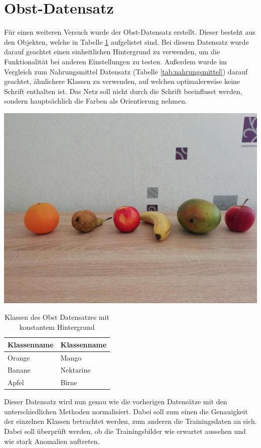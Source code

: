 \section{Obst-Datensatz}
Für einen weiteren Versuch wurde der Obst-Datensatz erstellt. Dieser besteht aus den Objekten, welche in Tabelle \ref{tab:obst} aufgelistet sind. Bei diesem Datensatz wurde darauf geachtet einen einheitlichen Hintergrund zu verwenden, um die Funktionalität bei anderen Einstellungen zu testen. Außerdem wurde im Vergleich zum Nahrungsmittel Datensatz (Tabelle \ref{tab:nahrungsmittel}) darauf geachtet, ähnlichere Klassen zu verwenden, auf welchen optimalerweise keine Schrift enthalten ist. Das Netz soll nicht durch die Schrift beeinflusst werden, sondern hauptsächlich die Farben als Orientierung nehmen.
\begin{table}[htb]
\caption{Klassen des Obst Datensatzes mit konstantem Hintergrund}
\center
\begin{minipage}[c]{.4\textwidth} 
\includegraphics[width=.8\textwidth]{Sources/Obst_mit_hintergrund}  
\end{minipage} 
\begin{minipage}[c]{.4\textwidth}\label{tab:obst}   
\begin{tabular}{|l|l|}
\hline
Klassenname & Klassenname\\
\hline
Orange & Mango\\
Banane & Nektarine\\
Apfel & Birne\\
\hline
\end{tabular} 
\end{minipage}
\end{table}  
Dieser Datensatz wird nun genau wie die vorherigen Datensätze mit den unterschiedlichen Methoden normalisiert. Dabei soll zum einen die Genauigkeit der einzelnen Klassen betrachtet werden, zum anderen die Trainingsdaten an sich. Dabei soll überprüft werden, ob die Trainingsbilder wie erwartet aussehen und wie stark Anomalien auftreten. 
